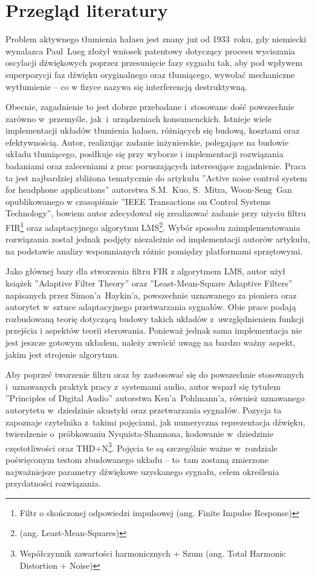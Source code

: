 \section{Przegląd literatury}
Problem aktywnego tłumienia hałasu jest znany już od 1933~roku, gdy niemiecki wynalazca Paul~Lueg złożył wniosek patentowy \cite{LuegPatent} dotyczący procesu wyciszania oscylacji dźwiękowych poprzez przesunięcie fazy sygnału tak, aby pod wpływem superpozycji faz dźwięku oryginalnego oraz tłumiącego, wywołać mechaniczne wytłumienie -- co w fizyce nazywa się interferencją destruktywną.

Obecnie, zagadnienie to jest dobrze przebadane i~stosowane dość powszechnie zarówno w~przemyśle, jak~i~urządzeniach konsumenckich. Istnieje wiele implementacji układów tłumienia hałasu, różniących się budową, kosztami oraz efektywnością. Autor, realizując zadanie inżynierskie, polegające na budowie układu tłumiącego, posiłkuje się przy wyborze i implementacji rozwiązania badaniami oraz zaleceniami z prac poruszających interesujące zagadnienie. Praca ta jest najbardziej zbliżona tematycznie do artykułu ''Active noise control system for headphone applications'' \cite{ANC4HP} autorstwa S.M.~Kuo, S.~Mitra, Woon-Seng~Gan opublikowanego w czasopiśmie ''IEEE Transactions on Control Systems Technology'', bowiem autor zdecydował się zrealizować zadanie przy użyciu filtru FIR\footnote{Filtr o skończonej odpowiedzi impulsowej (ang. Finite Impulse Response)} oraz  adaptacyjnego algorytmu LMS\footnote{%
(ang. Least-Mean-Squares)}. Wybór sposobu zaimplementowania rozwiązania został jednak podjęty niezależnie od implementacji autorów artykułu, na podstawie analizy wspomnianych różnic pomiędzy platformami sprzętowymi.

Jako głównej bazy dla stworzenia filtru FIR z algorytmem LMS, autor użył książek ''Adaptive Filter Theory'' oraz ''Least-Mean-Square Adaptive Filters'' napisanych przez Simon'a~Haykin'a, powszechnie uznawanego za pioniera oraz autorytet w~sztuce adaptacyjnego przetwarzania sygnałów. Obie prace podają rozbudowaną teorię dotyczącą budowy takich układów z~uwzględnieniem funkcji przejścia i aspektów teorii sterowania. Ponieważ jednak sama implementacja nie jest jeszcze gotowym układem, należy zwrócić uwagę na bardzo ważny aspekt, jakim jest strojenie algorytmu.

Aby poprzeć tworzenie filtru oraz by zastosować się do powszechnie stosowanych i~uznawanych praktyk pracy z~systemami audio, autor wsparł się tytułem ''Principles of Digital Audio'' autorstwa Ken'a~Pohlmann'a, również uznawanego autorytetu w~dziedzinie akustyki oraz przetwarzania sygnałów. Pozycja ta zapoznaje czytelnika z~takimi pojęciami, jak numeryczna reprezentacja d\'zwięku, twierdzenie o~próbkowaniu Nyquista-Shannona, kodowanie w~dziedzinie częstotliwości oraz THD+N\footnote{Współczynnik zawartości harmonicznych + Szum	(ang. Total Harmonic Distortion + Noise)}. Pojęcia te są szczególnie ważne w~rozdziale poświęconym testom zbudowanego układu -- to~tam zostaną zmierzone najważniejsze parametry d\'zwiękowe uzyskanego sygnału, celem określenia przydatności rozwiązania.


